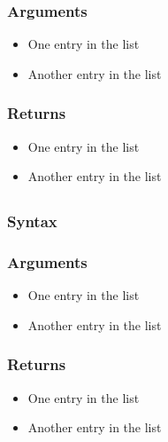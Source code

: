 \documentclass[]{jss}
\begin{document}
\subsubsection{Arguments}

\begin{itemize}

  \item One entry in the list
  \item Another entry in the list
  
\end{itemize}

\subsubsection{Returns}

\begin{itemize}

  \item One entry in the list
  \item Another entry in the list
  
\end{itemize}

\subsection[create_node_list]{}

\subsubsection{Syntax}

\subsubsection{Arguments}

\begin{itemize}

  \item One entry in the list
  \item Another entry in the list
  
\end{itemize}

\subsubsection{Returns}

\begin{itemize}

  \item One entry in the list
  \item Another entry in the list
  
\end{itemize}

\renewcommand\refname{References}

\end{document}
